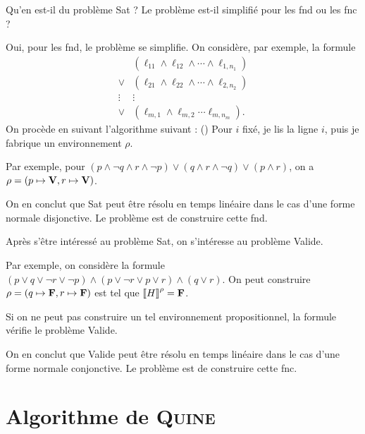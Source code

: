 \todo{}
\begin{prv}
\end{prv}

\begin{rmk}
	Qu'en est-il du problème {\sc Sat} ? Le problème est-il simplifié pour les {\sc fnd}\/ ou les {\sc fnc}\/ ?
	
	Oui, pour les {\sc fnd}, le problème se simplifie. On considère, par exemple, la formule \[
		\begin{array}{cc}
			&(\ell_{11} \land \ell_{12}\land \cdots \land \ell_{1,n_1})\\
			\lor&(\ell_{21} \land \ell_{22}\land \cdots \land \ell_{2,n_2})\\
			\vdots&\vdots\\
			\lor&(\ell_{m,1} \land \ell_{m,2} \cdots \ell_{m,n_m}).
		\end{array}
	\]
	On procède en suivant l'algorithme suivant :
	()
	Pour $i$\/ fixé, je lis la ligne $i$, puis je fabrique un environnement $\rho$.

	Par exemple, pour $(p \land \lnot q \land r \land \lnot p) \lor (q \land r \land \lnot q) \lor (p \land r)$, on a $\rho = (p \mapsto {\mathbf{V}}, r \mapsto {\mathbf{V}})$.

	On en conclut que {\sc Sat}\/ peut être résolu en temps linéaire dans le cas d'une forme normale disjonctive. Le problème est de construire cette {\sc fnd}.
\end{rmk}

\begin{rmk}
	Après s'être intéressé au problème {\sc Sat}, on s'intéresse au problème Valide.

	Par exemple, on considère la formule $(p \lor q \lor\lnot r \lor \lnot p) \land (p \lor \lnot r \lor p \lor r) \land (q \lor r)$.
	On peut construire $\rho = (q\mapsto {\mathbf{F}}, r \mapsto {\mathbf{F}})$\/ est tel que $\left\llbracket H \right\rrbracket^\rho = {\mathbf{F}}$.

	Si on ne peut pas construire un tel environnement propositionnel, la formule vérifie le problème Valide.

	On en conclut que Valide peut être résolu en temps linéaire dans le cas d'une forme normale conjonctive. Le problème est de construire cette {\sc fnc}.
\end{rmk}

\section{Algorithme de {\scshape Quine}}

